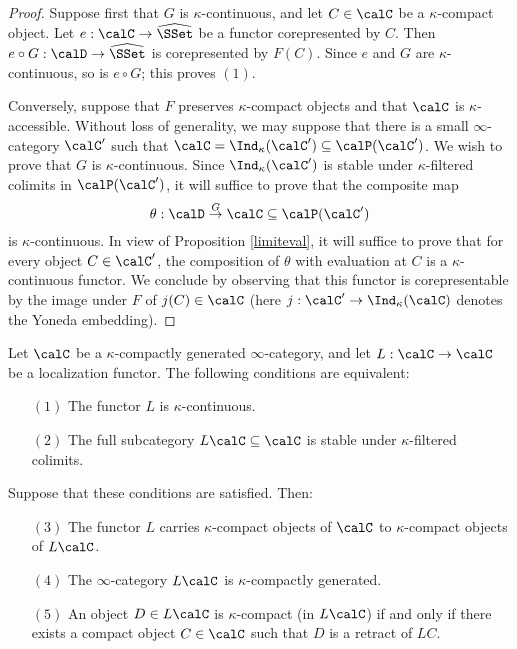 \begin{proof}
Suppose first that $G$ is $\kappa$-continuous, and let $C \in \calC$ be a $\kappa$-compact object. Let $e: \calC \rightarrow \widehat{\SSet}$ be a functor corepresented by $C$. Then
$e \circ G: \calD \rightarrow \widehat{\SSet}$ is corepresented by $F(C)$. Since $e$ and $G$
are $\kappa$-continuous, so is $e \circ G$; this proves $(1)$.

Conversely, suppose that $F$ preserves $\kappa$-compact objects and that $\calC$ is $\kappa$-accessible. Without loss of generality, we may suppose that there is a small $\infty$-category $\calC'$ such that $\calC = \Ind_{\kappa}(\calC') \subseteq \calP(\calC')$. We wish to prove
that $G$ is $\kappa$-continuous. Since $\Ind_{\kappa}(\calC')$ is stable under $\kappa$-filtered colimits in $\calP(\calC')$, it will suffice to prove that the composite map
$$ \theta: \calD \stackrel{G}{\rightarrow} \calC \subseteq \calP(\calC') $$
is $\kappa$-continuous. In view of Proposition \ref{limiteval}, it will suffice to prove that
for every object $C \in \calC'$, the composition of $\theta$ with evaluation at $C$ is
a $\kappa$-continuous functor. We conclude by observing that this functor is corepresentable
by the image under $F$ of $j(C) \in \calC$ (here $j: \calC' \rightarrow \Ind_{\kappa}(\calC)$ denotes the Yoneda embedding). 
\end{proof}

\begin{corollary}\label{starmin}
Let $\calC$ be a $\kappa$-compactly generated $\infty$-category, and let
$L: \calC \rightarrow \calC$ be a localization functor. The following conditions are equivalent:
\begin{itemize}
\item[$(1)$] The functor $L$ is $\kappa$-continuous.
\item[$(2)$] The full subcategory $L \calC \subseteq \calC$ is stable under $\kappa$-filtered colimits.
\end{itemize}
Suppose that these conditions are satisfied. Then:
\begin{itemize}
\item[$(3)$] The functor $L$ carries $\kappa$-compact objects of $\calC$ to $\kappa$-compact objects
of $L \calC$.

\item[$(4)$] The $\infty$-category $L \calC$ is $\kappa$-compactly generated.

\item[$(5)$] An object $D \in L \calC$ is $\kappa$-compact (in $L \calC$) if and only if
there exists a compact object $C \in \calC$ such that $D$ is a retract of $LC$.
\end{itemize}

\end{corollary}

